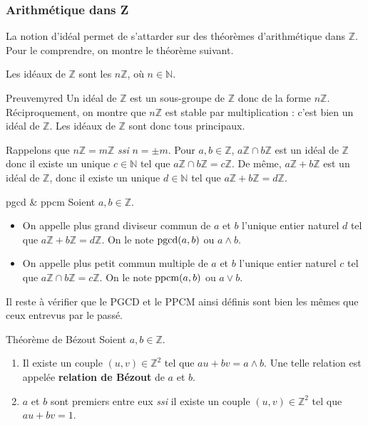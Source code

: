     \subsubsection{Arithmétique dans Z}

    La notion d’idéal permet de s’attarder sur des théorèmes d’arithmétique dans $\mathbb{Z}$. Pour le comprendre, on montre le théorème suivant.

    \begin{theo}{}{}
        Les idéaux de $\mathbb{Z}$ sont les $n \mathbb{Z}$, où $n \in \mathbb{N}$.
    \end{theo}

    \begin{demo}{Preuve}{myred}
        Un idéal de $\mathbb{Z}$ est un sous-groupe de $\mathbb{Z}$ donc de la forme $n \mathbb{Z}$. Réciproquement, on montre que $n \mathbb{Z}$ est stable par multiplication : c’est bien un idéal de $\mathbb{Z}$. Les idéaux de $\mathbb{Z}$ sont donc tous principaux.
    \end{demo}

    Rappelons que $n \mathbb{Z} = m \mathbb{Z}$ \textit{ssi} $n = \pm m$. Pour $a,b \in \mathbb{Z}$, $a \mathbb{Z} \cap b \mathbb{Z}$ est un idéal de $\mathbb{Z}$ donc il existe un unique $c \in \mathbb{N}$ tel que $a \mathbb{Z} \cap b \mathbb{Z} = c \mathbb{Z}$. De même, $a \mathbb{Z} + b \mathbb{Z}$ est un idéal de $\mathbb{Z}$, donc il existe un unique $d \in \mathbb{N}$ tel que $a \mathbb{Z} + b \mathbb{Z} = d \mathbb{Z}$.
    
    \begin{defi}{pgcd \& ppcm}{}
        Soient $a,b \in \mathbb{Z}$.
        \begin{itemize}
            \item On appelle plus grand diviseur commun de $a$ et $b$ l’unique entier naturel $d$ tel que $a \mathbb{Z} + b \mathbb{Z} = d \mathbb{Z}$. On le note $\operatorname{pgcd}(a,b)$ ou $a \wedge b$.
            \item On appelle plus petit commun multiple de $a$ et $b$ l’unique entier naturel $c$ tel que $a \mathbb{Z} \cap b \mathbb{Z} = c \mathbb{Z}$. On le note $\operatorname{ppcm}(a,b)$ ou $a \vee b$.
        \end{itemize}
    \end{defi}

    Il reste à vérifier que le PGCD et le PPCM ainsi définis sont bien les mêmes que ceux entrevus par le passé.

    \begin{theo}{Théorème de Bézout}{}
        Soient $a,b \in \mathbb{Z}$.
        \begin{enumerate}
            \item Il existe un couple $(u,v) \in \mathbb{Z}^2$ tel que $au + bv = a \wedge b$. Une telle relation est appelée \textbf{relation de Bézout} de $a$ et $b$.
            \item $a$ et $b$ sont premiers entre eux \textit{ssi} il existe un couple $(u,v) \in \mathbb{Z}^2$ tel que $au + bv = 1$.
        \end{enumerate}
    \end{theo}

